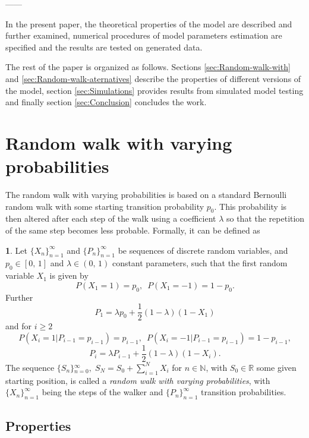 \documentclass{amsart}
\theoremstyle{definition}
\newtheorem{defn}[thm]{\protect\definitionname}
\theoremstyle{plain}
\theoremstyle{plain}
\theoremstyle{plain}
\numberwithin{equation}{section}
\providecommand{\definitionname}{Definition}
\begin{document}
------

In the present paper, the theoretical properties of the model are
described and further examined, numerical procedures of model
parameters estimation are specified and the results are tested on
generated data.

The rest of the paper is organized as follows. Sections
\ref{sec:Random-walk-with} and \ref{sec:Random-walk-aternatives}
describe the properties of different versions of the model,
section \ref{sec:Simulations} provides results from simulated
model testing and finally section \ref{sec:Conclusion} concludes
the work.

\section{Random walk with varying probabilities\label{sec:Random-walk-with}}

The random walk with varying probabilities is based on a standard
Bernoulli random walk \cite{feller1957introduction} with some starting
transition probability $p_{0}$. This probability is then altered
after each step of the walk using a coefficient $\lambda$ so that
the repetition of the same step becomes less probable. Formally, it
can be defined as
\begin{defn}
\label{success_punished}Let ${\{X_{n}\}}_{n=1}^{\infty}$ and ${\{P_{n}\}}_{n=1}^{\infty}$
be sequences of discrete random variables, and $p_{0}\in[0,\,1]$
and $\lambda\in(0,\,1)$ constant parameters, such that the first
random variable $X_{1}$ is given by
\[
P(X_{1}=1)=p_{0},\,\,\,
P(X_{1}=-1)=1-p_{0}.
\]
Further
\begin{equation}
P_{1}=\lambda p_{0}+\frac{1}{2}(1-\lambda)(1-X_{1})\label{eq:P!1_def}
\end{equation}
and for $i\geq2$
\[
P(X_{i}=1|P_{i-1}=p_{i-1})=p_{i-1},\,\,\,
P(X_{i}=-1|P_{i-1}=p_{i-1})=1-p_{i-1},
\]
\begin{equation}
P_{i}=\lambda P_{i-1}+\frac{1}{2}(1-\lambda)(1-X_{i}).\label{eq:Pi_def}
\end{equation}
The sequence ${\{S_{n}\}}{}_{n=0}^{\infty},\;S_{N}=S_{0}+\sum_{i=1}^{N}X_{i}$
for $n\in\mathbb{N}$, with $S_{0}\in\mathbb{R}$ some given starting
position, is called a \emph{random walk with varying probabilities},
with ${\{X_{n}\}}_{n=1}^{\infty}$ being the steps of the walker and
${\{P_{n}\}}_{n=1}^{\infty}$ transition probabilities.
\end{defn}

\subsection{Properties}
\end{document}
